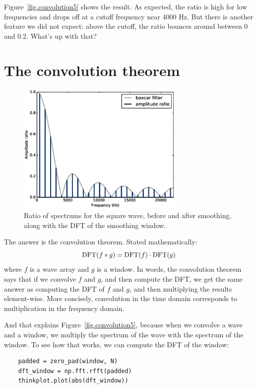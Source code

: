 \documentclass[12pt]{book}
\begin{document}
Figure~\ref{fig.convolution5} shows the result.  As expected, the
ratio is high for low frequencies and drops off at a cutoff frequency
near 4000 Hz.  But there is another feature we did not expect: above
the cutoff, the ratio bounces around between 0 and 0.2.
What's up with that?


\section{The convolution theorem}
\label{convtheorem}

\begin{figure}
\centerline{\includegraphics[height=2.5in]{figs/convolution6.eps}}
\caption{Ratio of spectrums for the square wave, before and after
  smoothing, along with the DFT of the smoothing window.}
\label{fig.convolution6}
\end{figure}

\newcommand{\DFT}{\mathrm{DFT}}
\newcommand{\IDFT}{\mathrm{IDFT}}

The answer is the convolution theorem.  Stated mathematically:
%
\[ \DFT(f \conv g) = \DFT(f) \cdot \DFT(g) \]
%
where $f$ is a wave array and $g$ is a window.  In words,
the convolution theorem says that if we convolve $f$ and $g$,
and then compute the DFT, we get the same answer as computing
the DFT of $f$ and $g$, and then multiplying the results
element-wise.  More concisely, convolution in the time
domain corresponds to multiplication in the frequency domain.

And that explains Figure~\ref{fig.convolution5}, because when we
convolve a wave and a window, we multiply the spectrum of
the wave with the spectrum of the window.  To see how that works,
we can compute the DFT of the window:

\begin{verbatim}
    padded = zero_pad(window, N)
    dft_window = np.fft.rfft(padded)
    thinkplot.plot(abs(dft_window))
\end{verbatim}
\end{document}
